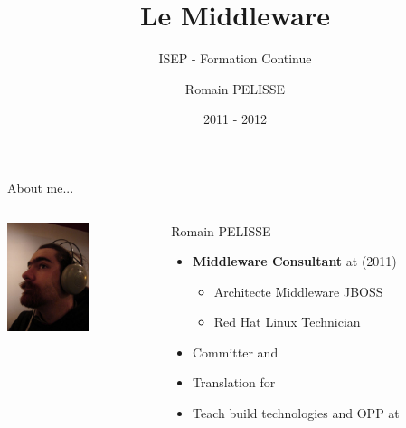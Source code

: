 \documentclass[handout]{beamer}
\title{Le Middleware}
\subtitle{ISEP - Formation Continue}
\author{Romain PELISSE}
\institute{Red Hat GmbH}
\date{2011 - 2012}
\begin{document}
  \begin{frame}
    \titlepage
  \end{frame}

  \begin{frame}{About me...}
    \begin{columns}

    \begin{column}[l]{.3\textwidth}
      \begin{center}
        \includegraphics[height=120px]{../img/rpe.jpg}
      \end{center}
    \end{column}

    \begin{column}[r]{.7\textwidth}
      \begin{block}{Romain PELISSE}
        \begin{itemize}
          \item \textbf{Middleware Consultant} at  (2011)
          \begin{itemize}
            \item Architecte Middleware JBOSS
            \item Red Hat Linux Technician
          \end{itemize}
          \item Committer  and 
          \item Translation for 
          \item Teach build technologies and OPP at 
        \end{itemize}
      \end{block}
    \end{column}
   \end{columns}
 \end{frame}

 
\end{document}

